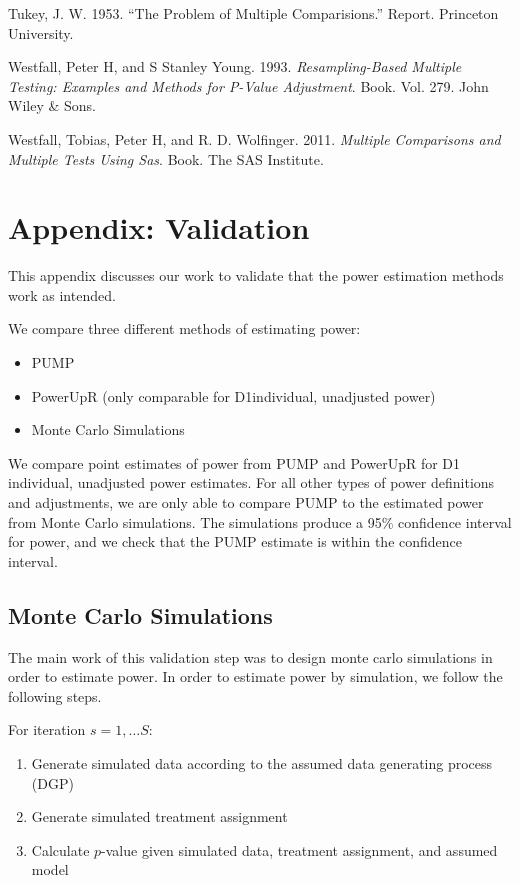 \documentclass[
]{article}
\providecommand{\tightlist}{%
  \setlength{\itemsep}{0pt}\setlength{\parskip}{0pt}}
\newlength{\cslhangindent}
\newenvironment{cslreferences}%
  {\setlength{\parindent}{0pt}%
  \everypar{\setlength{\hangindent}{\cslhangindent}}\ignorespaces}%
  {\par}
\begin{document}
\begin{cslreferences}
\leavevmode\hypertarget{ref-RN33098}{}%
Tukey, J. W. 1953. ``The Problem of Multiple Comparisions.'' Report.
Princeton University.

\leavevmode\hypertarget{ref-RN28696}{}%
Westfall, Peter H, and S Stanley Young. 1993. \emph{Resampling-Based
Multiple Testing: Examples and Methods for P-Value Adjustment}. Book.
Vol. 279. John Wiley \& Sons.

\leavevmode\hypertarget{ref-MTSAS}{}%
Westfall, Tobias, Peter H, and R. D. Wolfinger. 2011. \emph{Multiple
Comparisons and Multiple Tests Using Sas}. Book. The SAS Institute.
\end{cslreferences}

\section{Appendix: Validation}

This appendix discusses our work to validate that the power estimation
methods work as intended.

We compare three different methods of estimating power:

\begin{itemize}
\tightlist
\item
  PUMP
\item
  PowerUpR (only comparable for D1individual, unadjusted power)
\item
  Monte Carlo Simulations
\end{itemize}

We compare point estimates of power from PUMP and PowerUpR for D1
individual, unadjusted power estimates. For all other types of power
definitions and adjustments, we are only able to compare PUMP to the
estimated power from Monte Carlo simulations. The simulations produce a
95\% confidence interval for power, and we check that the PUMP estimate
is within the confidence interval.

\subsection{Monte Carlo Simulations}

The main work of this validation step was to design monte carlo
simulations in order to estimate power. In order to estimate power by
simulation, we follow the following steps.

For iteration \(s = 1, \dots S\):

\begin{enumerate}
\def\labelenumi{\arabic{enumi}.}
\tightlist
\item
  Generate simulated data according to the assumed data generating
  process (DGP)
\item
  Generate simulated treatment assignment
\item
  Calculate \(p\)-value given simulated data, treatment assignment, and
  assumed model
\end{enumerate}
\end{document}
